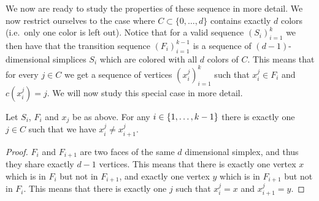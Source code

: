 We now are ready to study the properties of these sequence in more detail. We now restrict ourselves to the case where $C \subset \{0, \dots, d\}$ contains exactly $d$ colors (i.e.~only one color is left out). Notice that for a valid sequence $\left( S_i \right)_{i=1}^k$ we then have that the transition sequence $\left( F_i \right)_{i=1}^{k-1}$ is a sequence of $(d-1)$-dimensional simplices $S_i$ which are colored with all $d$ colors of $C$. This means that for every $j \in C$ we get a sequence of vertices $(x_i^j)_{i=1}^k$ such that $x_i^j \in F_i$ and $c(x_i^j) = j$. We will now study this special case in more detail.

\begin{lemma}
    Let $S_i$, $F_i$ and $x_j$ be as above. For any $i \in \left\{1, \dots, k-1\right\}$ there is exactly one $j \in C$ such that we have $x_i^j \neq x_{i+1}^j$.
\end{lemma}
\begin{proof}
    $F_i$ and $F_{i+1}$ are two faces of the same $d$ dimensional simplex, and thus they share exactly $d-1$ vertices. This means that there is exactly one vertex $x$ which is in $F_i$ but not in $F_{i+1}$, and exactly one vertex $y$ which is in $F_{i+1}$ but not in $F_i$. This means that there is exactly one $j$ such that $x_i^j = x$ and $x_{i+1}^j = y$.
\end{proof}


